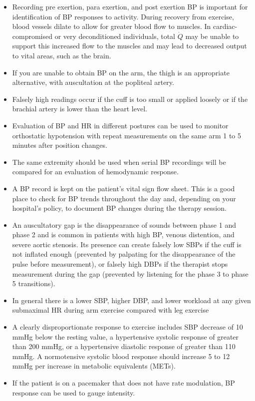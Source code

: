 \begin{itemize}
\item Recording pre exertion, para exertion, and post exertion BP is important for identification of BP responses to activity. During recovery from exercise, blood vessels dilate to allow for greater blood flow to muscles. In cardiac-compromised or very deconditioned individuals, total $\dot{Q}$ may be unable to support this increased flow to the muscles and may lead to decreased output to vital areas, such as the brain.
\item If you are unable to obtain BP on the arm, the thigh is an appropriate alternative, with auscultation at the popliteal artery.
\item Falsely high readings occur if the cuff is too small or applied loosely or if the brachial artery is lower than the heart level.
\item Evaluation of BP and HR in different postures can be used to monitor orthostatic hypotension with repeat measurements on the same arm 1 to 5 minutes after position changes.
\item The same extremity should be used when serial BP recordings will be compared for an evaluation of hemodynamic response.
\item A BP record is kept on the patient’s vital sign flow sheet. This is a good place to check for BP trends throughout the day and, depending on your hospital’s policy, to document BP changes during the therapy session.
\item An auscultatory gap is the disappearance of sounds between phase 1 and phase 2 and is common in patients with high BP, venous distention, and severe aortic stenosis. Its presence can create falsely low SBPs if the cuff is not inflated enough (prevented by palpating for the disappearance of the pulse before measurement), or falsely high DBPs if the therapist stops measurement during the gap (prevented by listening for the phase 3 to phase 5 transitions).
\item In general there is a lower SBP, higher DBP, and lower workload at any given submaximal HR during arm exercise compared with leg exercise \cite{dias_differences_2022}
\item A clearly disproportionate response to exercise includes SBP decrease of 10 mmHg below the resting value, a hypertensive systolic response of greater than 200 mmHg, or a hypertensive diastolic response of greater than 110 mmHg. A normotensive systolic blood response should increase 5 to 12 mmHg per increase in metabolic equivalents (METs).\footnotemark{}
\item If the patient is on a pacemaker that does not have rate modulation, BP response can be used to gauge intensity. 
\end{itemize}

